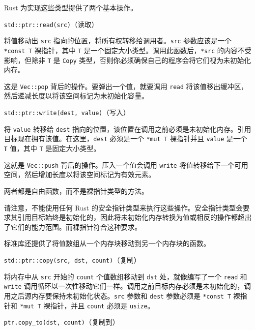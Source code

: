Rust 为实现这些类型提供了两个基本操作。

\begin{mySidenote}
\texttt{std::ptr::read(src)}（读取）
\end{mySidenote}

将值移动出 \texttt{src} 指向的位置，将所有权转移给调用者。\texttt{src} 参数应该是一个 \texttt{*const T} 裸指针，其中 \texttt{T} 是一个固定大小类型。调用此函数后，\texttt{*src} 的内容不受影响，但除非 \texttt{T} 是 \texttt{Copy} 类型，否则你必须确保自己的程序会将它们视为未初始化内存。

这是 \texttt{Vec::pop} 背后的操作。要弹出一个值，就要调用 \texttt{read} 将该值移出缓冲区，然后递减长度以将该空间标记为未初始化容量。

\begin{myNote}
\texttt{std::ptr::write(dest, value)}（写入）
\end{myNote}

将 \texttt{value} 转移给 \texttt{dest} 指向的位置，该位置在调用之前必须是未初始化内存。引用目标现在拥有该值。在这里，\texttt{dest} 必须是一个 \texttt{*mut T} 裸指针并且 \texttt{value} 是一个 \texttt{T} 值，其中 \texttt{T} 是固定大小类型。

这就是 \texttt{Vec::push} 背后的操作。压入一个值会调用 \texttt{write} 将值转移给下一个可用空间，然后增加长度以将该空间标记为有效元素。

两者都是自由函数，而不是裸指针类型的方法。

请注意，不能使用任何 Rust 的安全指针类型来执行这些操作。安全指针类型会要求其引用目标始终是初始化的，因此将未初始化内存转换为值或相反的操作都超出了它们的能力范围。而裸指针符合这种要求。

标准库还提供了将值数组从一个内存块移动到另一个内存块的函数。

\begin{myNote}
\texttt{std::ptr::copy(src, dst, count)}（复制）
\end{myNote}

将内存中从 \texttt{src} 开始的 \texttt{count} 个值数组移动到 \texttt{dst} 处，就像编写了一个 \texttt{read} 和 \texttt{write} 调用循环以一次性移动它们一样。调用之前目标内存必须是未初始化的，调用之后源内存要保持未初始化状态。\texttt{src} 参数和 \texttt{dest} 参数必须是 \texttt{*const T} 裸指针和 \texttt{*mut T} 裸指针，并且 \texttt{count} 必须是 \texttt{usize}。

\begin{myNote}
\texttt{ptr.copy\_to(dst, count)}（复制到）
\end{myNote}

